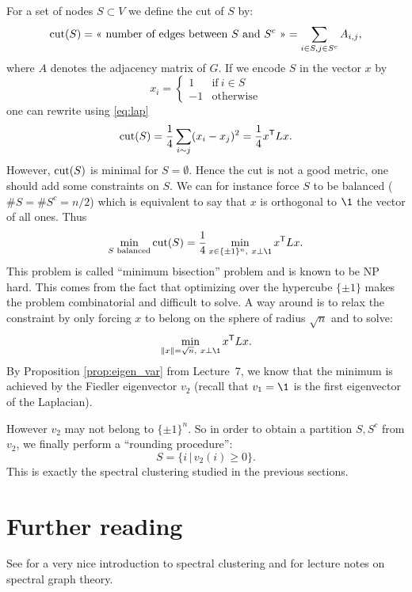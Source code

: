 \documentclass[11pt,nocut]{article}
\begin{document}
For a set of nodes $S \subset V$ we define the cut of $S$ by:
$$
{\rm cut}(S) = \text{<< number of edges between $S$ and $S^c$ >>}
= \sum_{i\in S, j \in S^c} A_{i,j},
$$
where $A$ denotes the adjacency matrix of $G$. If we encode $S$ in the vector $x$ by
$$
x_i =
\begin{cases}
	1 & \text{if} \ i \in S \\
	-1 & \text{otherwise}
\end{cases}
$$
one can rewrite using \eqref{eq:lap}
$$
{\rm cut}(S) = \frac{1}{4} \sum_{i \sim j} (x_i-x_j)^2
=\frac{1}{4} x^{{\sf T}} L x.
$$
However, ${\rm cut}(S)$ is minimal for $S = \emptyset$. Hence the cut is not a good metric, one should add some constraints on $S$.
We can for instance force $S$ to be balanced ($\# S = \# S^c = n/2$) which is equivalent to say that $x$ is orthogonal to $\1$ the vector of all ones. Thus
$$
\min_{S \text{ balanced}} {\rm cut}(S)
= \frac{1}{4} \min_{x \in \{\pm 1\}^n, \ x \perp \1} x^{\sT} L x.
$$
This problem is called ``minimum bisection'' problem and is known to be NP hard. This comes from the fact that optimizing over the hypercube $\{\pm 1\}$ makes the problem combinatorial and difficult to solve. A way around is to relax the constraint by only forcing $x$ to belong on the sphere of radius $\sqrt{n}$ and to solve:
$$
\min_{\|x\| = \sqrt{n}, \ x \perp \1} x^{\sT} L x.
$$
By Proposition \ref{prop:eigen_var} from Lecture~7, we know that the minimum is achieved by the Fiedler eigenvector $v_2$ (recall that $v_1 = \1$ is the first eigenvector of the Laplacian).

However $v_2$ may not belong to $\{\pm 1\}^n$. So in order to obtain a partition $S,S^c$ from $v_2$, we finally perform a ``rounding procedure'':
$$
S = \{ i \, | \, v_2(i) \geq 0\}.
$$
This is exactly the spectral clustering studied in the previous sections.

\section*{Further reading}

See \cite{von2007tutorial} for a very nice introduction to spectral clustering and \cite{spielman2012spectral} for lecture notes on spectral graph theory.

\vspace{1cm}
\centerline{}




\end{document}

